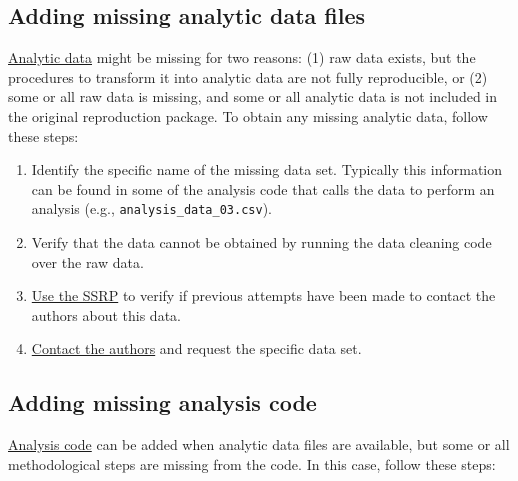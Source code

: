 \documentclass[
]{book}
\providecommand{\tightlist}{%
  \setlength{\itemsep}{0pt}\setlength{\parskip}{0pt}}
\begin{document}
\hypertarget{ad}{%
\subsection{Adding missing analytic data files}\label{ad}}

\protect\hyperlink{describe-inputs}{Analytic data} might be missing for two reasons: (1) raw data exists, but the procedures to transform it into analytic data are not fully reproducible, or (2) some or all raw data is missing, and some or all analytic data is not included in the original reproduction package. To obtain any missing analytic data, follow these steps:

\begin{enumerate}
\def\labelenumi{\arabic{enumi}.}
\tightlist
\item
  Identify the specific name of the missing data set. Typically this information can be found in some of the analysis code that calls the data to perform an analysis (e.g., \texttt{analysis\_data\_03.csv}).\\
\item
  Verify that the data cannot be obtained by running the data cleaning code over the raw data.\\
\item
  \href{ADD\%20LINK}{Use the SSRP} to verify if previous attempts have been made to contact the authors about this data.\\
\item
  \protect\hyperlink{tips-for-communication}{Contact the authors} and request the specific data set.
\end{enumerate}

\hypertarget{ac}{%
\subsection{Adding missing analysis code}\label{ac}}

\protect\hyperlink{describe-inputs}{Analysis code} can be added when analytic data files are available, but some or all methodological steps are missing from the code. In this case, follow these steps:
\end{document}

